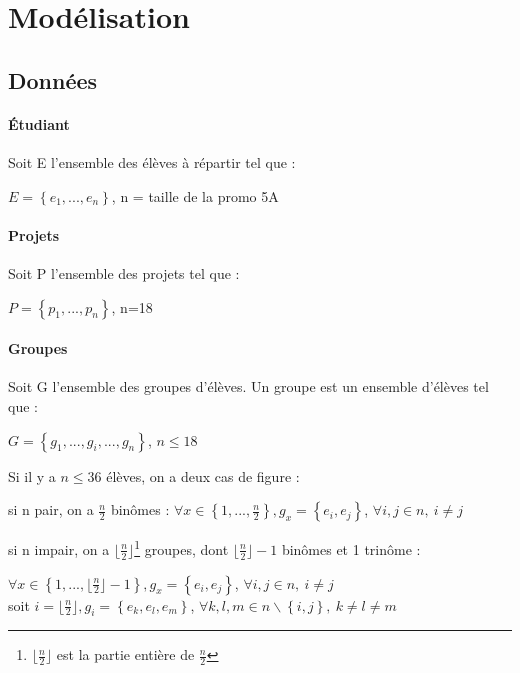 \documentclass[10pt,a4paper]{scrartcl}
\begin{document}
\section{Modélisation}
\subsection{Données}
\paragraph{Étudiant}Soit E l'ensemble des élèves à répartir tel que : \\
\begin{center}
	$E=\left\{ e_{1}, ..., e_{n} \right\}$, n = taille de la promo 5A
\end{center}
\paragraph{Projets}Soit P l'ensemble des projets tel que : \\
\begin{center}
	$P=\left\{ p_{1}, ..., p_{n} \right\}$, n=18
\end{center}

\paragraph{Groupes}Soit G l'ensemble des groupes d'élèves. Un groupe est un ensemble d'élèves tel que : \\
\begin{center}
	$G=\left\{ g_{1}, ..., g_{i}, ..., g_{n} \right\}$, $n \leqslant 18$
\end{center}
Si il y a $n \leqslant 36$ élèves, on a deux cas de figure : \\
\begin{itemize}
	\begin{item}
		si n pair, on a $\frac{n}{2}$ binômes :  $\forall x \in \left\{ 1, ..., \frac{n}{2} \right\}, g_{x} = \left\{ e_{i}, e_{j} \right\}$, $\forall i, j \in n,\ i \neq j$
	\end{item}
	\begin{item}
		si n impair, on a  $\lfloor \frac{n}{2} \rfloor$\footnote{$\lfloor \frac{n}{2} \rfloor$ est la partie entière de $\frac{n}{2}$} groupes, dont $\lfloor \frac{n}{2} \rfloor-1$ binômes et 1 trinôme :
		
		$\forall x \in \left\{ 1, ..., \lfloor \frac{n}{2} \rfloor -1 \right\}, g_{x} = \left\{ e_{i}, e_{j} \right\}$, $\forall i, j \in n,\ i \neq j$ \\
		soit $i=\lfloor \frac{n}{2} \rfloor, g_{i} = \left\{ e_{k}, e_{l}, e_{m} \right\}$, $\forall k, l, m \in n\backslash\left\{ i, j \right\},\ k \neq l \neq m$ \newline
	\end{item}
\end{itemize}
\end{document}
